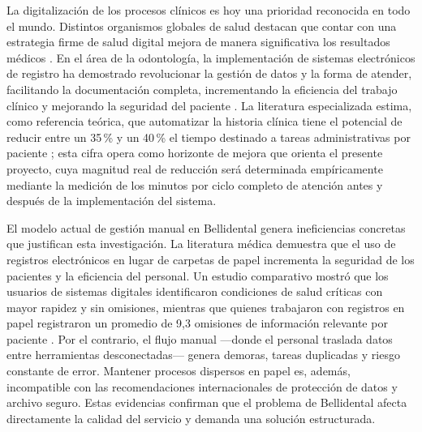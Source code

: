 
La digitalización de los procesos clínicos es hoy una prioridad reconocida
en todo el mundo. Distintos organismos globales de salud destacan que
contar con una estrategia firme de salud digital mejora de manera
significativa los resultados médicos \cite{WHO2021DigitalHealth}. En el
área de la odontología, la implementación de sistemas electrónicos de
registro ha demostrado revolucionar la gestión de datos y la forma de
atender, facilitando la documentación completa, incrementando la eficiencia
del trabajo clínico y mejorando la seguridad del paciente
\cite{Sravya2024EHRDentistry}. La literatura especializada estima, como
referencia teórica, que automatizar la historia clínica tiene el potencial
de reducir entre un 35\,\% y un 40\,\% el tiempo destinado a tareas
administrativas por paciente \cite{Sravya2024EHRDentistry}; esta cifra
opera como horizonte de mejora que orienta el presente proyecto, cuya
magnitud real de reducción será determinada empíricamente mediante la
medición de los minutos por ciclo completo de atención antes y después
de la implementación del sistema.

El modelo actual de gestión manual en Bellidental genera ineficiencias
concretas que justifican esta investigación. La literatura médica demuestra
que el uso de registros electrónicos en lugar de carpetas de papel
incrementa la seguridad de los pacientes y la eficiencia del personal.
Un estudio comparativo mostró que los usuarios de sistemas digitales
identificaron condiciones de salud críticas con mayor rapidez y sin
omisiones, mientras que quienes trabajaron con registros en papel
registraron un promedio de 9,3 omisiones de información relevante por
paciente \cite{pmc2024digital}. Por el contrario, el flujo manual —donde
el personal traslada datos entre herramientas desconectadas— genera
demoras, tareas duplicadas y riesgo constante de error. Mantener procesos
dispersos en papel es, además, incompatible con las recomendaciones
internacionales de protección de datos y archivo seguro. Estas evidencias
confirman que el problema de Bellidental afecta directamente la calidad
del servicio y demanda una solución estructurada.

